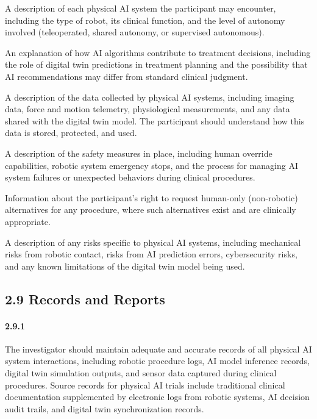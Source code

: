 \documentclass[11pt]{article}
\begin{document}
\begin{description}[leftmargin=2.5cm,style=sameline]

\item[(a)] A description of each physical AI system the participant may encounter, including the type of robot, its clinical function, and the level of autonomy involved (teleoperated, shared autonomy, or supervised autonomous).

\item[(b)] An explanation of how AI algorithms contribute to treatment decisions, including the role of digital twin predictions in treatment planning and the possibility that AI recommendations may differ from standard clinical judgment.

\item[(c)] A description of the data collected by physical AI systems, including imaging data, force and motion telemetry, physiological measurements, and any data shared with the digital twin model. The participant should understand how this data is stored, protected, and used.

\item[(d)] A description of the safety measures in place, including human override capabilities, robotic system emergency stops, and the process for managing AI system failures or unexpected behaviors during clinical procedures.

\item[(e)] Information about the participant's right to request human-only (non-robotic) alternatives for any procedure, where such alternatives exist and are clinically appropriate.

\item[(f)] A description of any risks specific to physical AI systems, including mechanical risks from robotic contact, risks from AI prediction errors, cybersecurity risks, and any known limitations of the digital twin model being used.

\end{description}

\subsection{2.9 Records and Reports}

\paragraph{2.9.1} The investigator should maintain adequate and accurate records of all physical AI system interactions, including robotic procedure logs, AI model inference records, digital twin simulation outputs, and sensor data captured during clinical procedures. Source records for physical AI trials include traditional clinical documentation supplemented by electronic logs from robotic systems, AI decision audit trails, and digital twin synchronization records.
\end{document}
